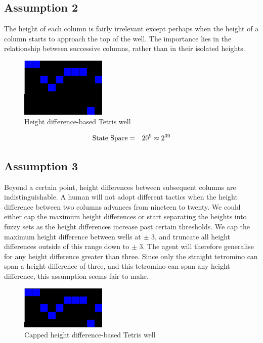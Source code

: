 \documentclass{rucsthesis}
\begin{document}
\subsection*{Assumption 2}

The height of each column is fairly irrelevant except perhaps when the height of a column starts to approach the top of the well. The importance lies in the relationship between successive columns, rather than in their isolated heights.

\begin{figure}[h]
\centering
\includegraphics[width=1.6in]{diffheightwell.png}
\caption{Height difference-based Tetris well}
\label{fig:diffheightwell}
\end{figure}

\begin{eqnarray*}
\centering
\textrm{State Space} & = & 20^{9} \approx 2^{39}
\end{eqnarray*}

\subsection*{Assumption 3}

Beyond a certain point, height differences between subsequent columns are indistinguishable. A human will not adopt different tactics when the height difference between two columns advances from nineteen to twenty. We could either cap the maximum height differences or start separating the heights into fuzzy sets as the height differences increase past certain thresholds. We cap the maximum height difference between wells at $\pm$ 3, and truncate all height differences outside of this range down to $\pm$ 3. The agent will therefore generalise for any height difference greater than three. Since only the straight tetromino can span a height difference of three, and this tetromino can span any height difference, this assumption seems fair to make. 

\begin{figure}[h]
\centering
\includegraphics[width=1.6in]{capdiffheightwell.png}
\caption{Capped height difference-based Tetris well}
\label{fig:capdiffheightwell}
\end{figure}
\end{document}
